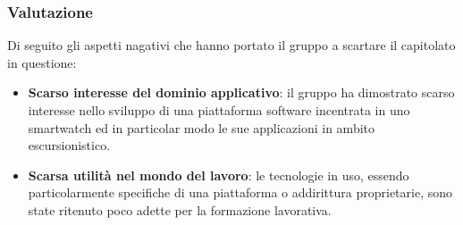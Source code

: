 \subsubsection{Valutazione}
Di seguito gli aspetti nagativi che hanno portato il gruppo a scartare il capitolato in questione:
\begin{itemize}
    \item \textbf{Scarso interesse del dominio applicativo}: il gruppo ha dimostrato scarso interesse nello sviluppo di una piattaforma software incentrata in uno smartwatch ed in particolar modo le sue applicazioni in ambito escursionistico.
    \item \textbf{Scarsa utilità nel mondo del lavoro}: le tecnologie in uso, essendo particolarmente specifiche di una piattaforma o addirittura proprietarie, sono state ritenuto poco adette per la formazione lavorativa.
\end{itemize}
